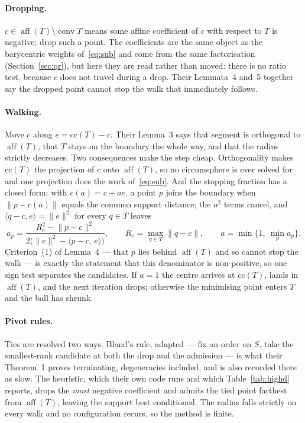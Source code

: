 \documentclass[10pt,a4paper]{article}
\theoremstyle{plain}
\DeclareMathOperator{\conv}{conv}
\DeclareMathOperator{\aff}{aff}
\newcommand{\norm}[1]{\lVert #1 \rVert}
\begin{document}
\paragraph{Dropping.} $c\in\aff(T)\setminus\conv T$ means some affine coefficient
of $c$ with respect to $T$ is negative; drop such a point. The coefficients are
the same object as the barycentric weights of~\eqref{eq:sub} and come from the
same factorisation (Section~\ref{sec:qr}), but here they are read rather than
moved: there is no ratio test, because $c$ does not travel during a drop. Their
Lemmata~4 and~5 together say the dropped point cannot stop the walk that
immediately follows.

\paragraph{Walking.} Move $c$ along $e=\mathrm{cc}(T)-c$. Their Lemma~3 says that
segment is orthogonal to $\aff(T)$, that $T$ stays on the boundary the whole way,
and that the radius strictly decreases. Two consequences make the step cheap.
Orthogonality makes $\mathrm{cc}(T)$ the projection of $c$ onto $\aff(T)$, so no
circumsphere is ever solved for and one projection does the work
of~\eqref{eq:sub}. And the stopping fraction has a closed form: with $c(a)=c+ae$,
a point $p$ joins the boundary when $\norm{p-c(a)}$ equals the common support
distance; the $a^2$ terms cancel, and $\langle q-c,e\rangle=\norm{e}^2$ for every
$q\in T$ leaves
\begin{equation}
  \label{eq:fgk-step}
  a_p=\frac{R_c^2-\norm{p-c}^2}
           {2\bigl(\norm{e}^2-\langle p-c,\,e\rangle\bigr)},
  \qquad R_c=\max_{q\in T}\norm{q-c},
  \qquad a=\min\{1,\ \min_p a_p\}.
\end{equation}
Criterion~(1) of Lemma~4 --- that $p$ lies behind $\aff(T)$ and so cannot stop the
walk --- is exactly the statement that this denominator is non-positive, so one
sign test separates the candidates. If $a=1$ the centre arrives at
$\mathrm{cc}(T)$, lands in $\aff(T)$, and the next iteration drops; otherwise the
minimising point enters $T$ and the ball has shrunk.

\paragraph{Pivot rules.} Ties are resolved two ways. Bland's rule, adapted --- fix
an order on $S$, take the smallest-rank candidate at both the drop and the
admission --- is what their Theorem~1 proves terminating, degeneracies included,
and is also recorded there as slow. The heuristic, which their own code runs and
which Table~\ref{tab:highd} reports, drops the \emph{most} negative coefficient and
admits the tied point farthest from $\aff(T)$, leaving the support best
conditioned. The radius falls strictly on every walk and no configuration recurs,
so the method is finite.
\end{document}
